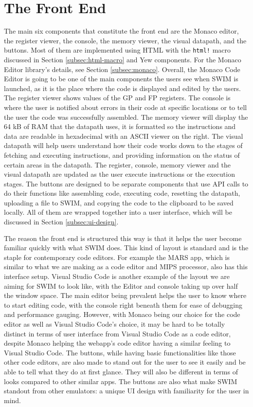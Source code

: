 \documentclass[
    paper=letter,
    parskip=half,
    fontsize=12pt,
    titlepage=firstiscover,
    toc=bibliography,
    numbers=endperiod
]{scrartcl}
\let\oldsection\section
\renewcommand{\section}{\newpage\oldsection}
\begin{document}
\section{The Front End}
\label{sec:front-end}

The main six components that constitute the front end are the Monaco
editor, the register viewer, the console, the memory viewer, the visual
datapath, and the buttons. Most of them are implemented using HTML with
the \texttt{html!} macro discussed in Section \ref{subsec:html-macro}
and Yew components. For the Monaco Editor library's details, see Section
\ref{subsec:monaco}. Overall, the Monaco Code Editor is going to be one
of the main components the users see when SWIM is launched, as it is the
place where the code is displayed and edited by the users. The register
viewer shows values of the GP and FP registers. The console is where the
user is notified about errors in their code at specific locations or to
tell the user the code was successfully assembled. The memory viewer
will display the 64 kB of RAM that the datapath uses, it is formatted so
the instructions and data are readable in hexadecimal with an ASCII
viewer on the right. The visual datapath will help users understand how
their code works down to the stages of fetching and executing
instructions, and providing information on the status of certain areas
in the datapath. The register, console, memory viewer and the visual
datapath are updated as the user execute instructions or the execution
stages. The buttons are designed to be separate components that use API
calls to do their functions like assembling code, executing code,
resetting the datapath, uploading a file to SWIM, and copying the code
to the clipboard to be saved locally. All of them are wrapped together
into a user interface, which will be discussed in Section
\ref{subsec:ui-design}.

The reason the front end is structured this way is that it helps the
user become familiar quickly with what SWIM does. This kind of layout is
standard and is the staple for contemporary code editors. For example
the MARS app, which is similar to what we are making as a code editor
and MIPS processor, also has this interface setup. Visual Studio Code is
another example of the layout we are aiming for SWIM to look like, with
the Editor and console taking up over half the window space. The main
editor being prevalent helps the user to know where to start editing
code, with the console right beneath them for ease of debugging and
performance gauging. However, with Monaco being our choice for the code
editor as well as Visual Studio Code's choice, it may be hard to be
totally distinct in terms of user interface from Visual Studio Code as a
code editor, despite Monaco helping the webapp's code editor having a
similar feeling to Visual Studio Code. The buttons, while having basic
functionalities like those other code editors, are also made to stand
out for the user to see it easily and be able to tell what they do at
first glance. They will also be different in terms of looks compared to
other similar apps. The buttons are also what make SWIM standout from
other emulators: a unique UI design with familiarity for the user in
mind.
\end{document}

